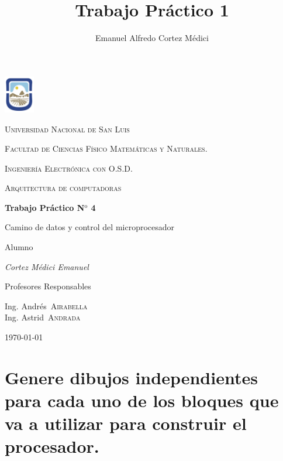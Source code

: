 \documentclass[11pt,a4paper]{article}
\author{Emanuel Alfredo Cortez Médici}
\title{Trabajo Práctico 1}
\begin{document}
	\begin{titlepage}
	\centering
	
	\includegraphics[width=0.1\textwidth]{fotos/unsl.png} 
	
	{\scshape\LARGE Universidad Nacional de San Luis\par}
	{\scshape Facultad de Ciencias Físico Matemáticas y Naturales.\par}
	{\scshape Ingeniería Electrónica con O.S.D.\par}
	\vspace{1.5cm}
	{\scshape\Large Arquitectura de computadoras \par}
	\vspace{1.5cm}
	{\huge\bfseries Trabajo Práctico N$^{\text{o}}$ 4
	
    Camino de datos y control del microprocesador\par}
	\vspace{2cm}
	Alumno\par
	{\Large\itshape 	
	Cortez Médici Emanuel\par}
	\vfill
	Profesores Responsables\par
	Ing. Andrés~\textsc{Airabella}\\
	Ing. Astrid~\textsc{Andrada}
	
	\vfill

	{\large \today\par}
\end{titlepage}

\newpage

\section{Genere dibujos independientes para cada uno de los bloques que va a utilizar para
construir el procesador.}
\end{document}
